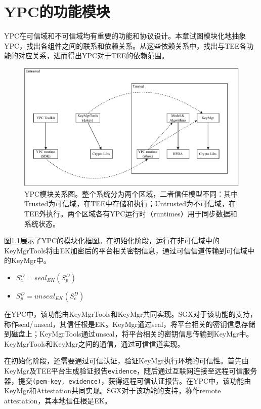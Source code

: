 \chapter{YPC的功能模块}

YPC在可信域和不可信域均有重要的功能和协议设计。本章试图模块化地抽象YPC，找出各组件之间的联系和依赖关系。从这些依赖关系中，找出与TEE各功能的对应关系，进而得出YPC对于TEE的依赖范围。

\begin{figure}
    \centering
    \includegraphics[width=140mm]{figure/ypc-modular.pdf}
    \caption{YPC模块关系图。整个系统分为两个区域，二者信任模型不同：其中Trusted为可信域，在TEE中存储和执行；Untrusted为不可信域，在TEE外执行。两个区域各有YPC运行时（runtimes）用于同步数据和系统状态。}
    \label{fig:ypc-modular}
\end{figure}

图\ref{fig:ypc-modular}展示了YPC的模块化框图。在初始化阶段，运行在非可信域中的KeyMgrTools将由EK加密后的平台相关密钥信息，通过可信信道传输到可信域中的KeyMgr中。

\begin{itemize}
    \item $S^D_c = seal_{EK}(S^D_p)$
    \item $S^D_p = unseal_{EK}(S^D_c)$
\end{itemize}

在YPC中，该功能由KeyMgrTools和KeyMgr共同实现。SGX对于该功能的支持，称作seal/unseal，其信任根是EK。KeyMgr通过seal，将平台相关的密钥信息存储到磁盘上；KeyMgrTools通过unseal，将平台相关的密钥信息传输到KeyMgr中。KeyMgrTools和KeyMgr之间的通信，通过可信信道实现。

在初始化阶段，还需要通过可信认证，验证KeyMgr执行环境的可信性。首先由KeyMgr及TEE平台生成验证报告\texttt{evidence}，随后通过互联网连接至远程可信服务器，提交\texttt{(pem-key, evidence)}，获得远程可信认证报告。在YPC中，该功能由KeyMgr和Attestation共同实现。SGX对于该功能的支持，称作remote attestation，其本地信任根是EK。

